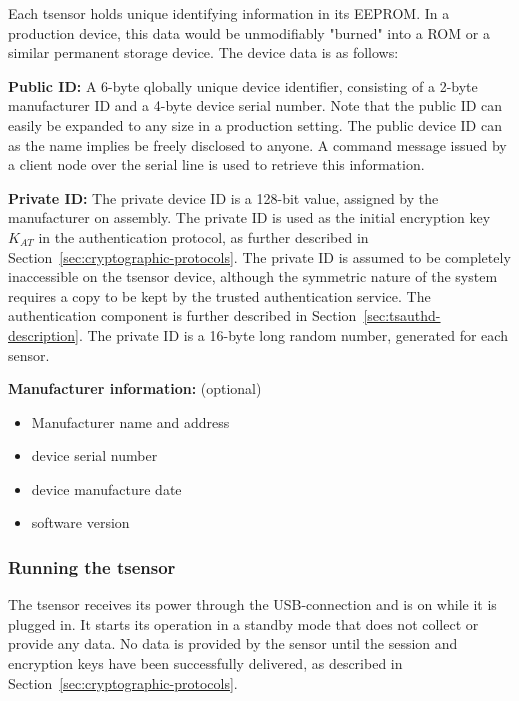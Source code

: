 Each tsensor holds unique identifying information in its EEPROM. In a production device, this data would be unmodifiably "burned" into a ROM or a similar permanent storage device. The device data is as follows:
%
\begin{description}

\item \textbf{Public ID:} A 6-byte qlobally unique device identifier, consisting of a 2-byte manufacturer ID and a 4-byte device serial number. Note that the public ID can easily be expanded to any size in a production setting. The public device ID can as the name implies be freely disclosed to anyone. A command message issued by a client node over the serial line is used to retrieve this information.

\item \textbf{Private ID:} The private device ID is a 128-bit value, assigned by the manufacturer on assembly. The private ID is used as the initial encryption key $K_{AT}$ in the authentication protocol, as further described in Section~\ref{sec:cryptographic-protocols}. The private ID is assumed to be completely inaccessible on the tsensor device, although the symmetric nature of the system requires a copy to be kept by the trusted authentication service. The authentication component is further described in Section~\ref{sec:tsauthd-description}. The private ID is a 16-byte long random number, generated for each sensor.

\item \textbf{Manufacturer information:} (optional)
\begin{itemize}
\item Manufacturer name and address
\item device serial number
\item device manufacture date
\item software version
\end{itemize}
\end{description}

\subsubsection{Running the tsensor}

The tsensor receives its power through the USB-connection and is on while it is plugged in. It starts its operation in a standby mode that does not collect or provide any data. No data is provided by the sensor until the session and encryption keys have been successfully delivered, as described in Section~\ref{sec:cryptographic-protocols}.

